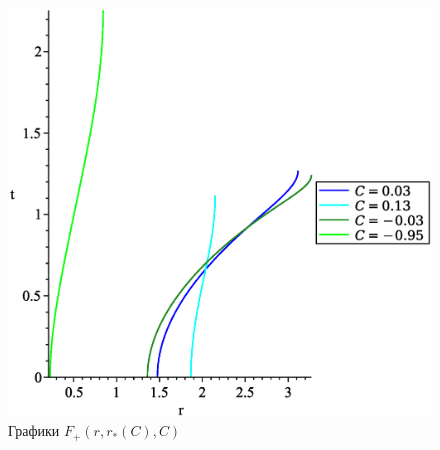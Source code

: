 \documentclass{article}
\begin{document}
\begin{figure}[ht!]
\begin{center}
\includegraphics[scale=0.48]{Frad.eps}
\caption{Графики $F_+(r, r_*(C), C)$}
\end{center}
\end{figure}
\end{document}
